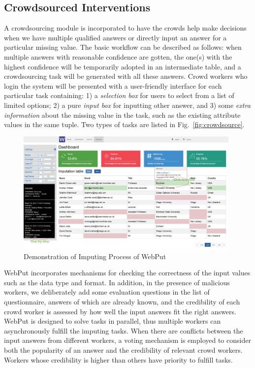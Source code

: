 \documentclass[sigconf]{acmart}
\begin{document}
\subsection{Crowdsourced Interventions}
%
A crowdsourcing module is incorporated to have the crowds help make decisions when we have multiple qualified answers or directly input an answer for a particular missing value.
%
The basic workflow can be described as follows: when multiple answers with reasonable confidence are gotten, the one(s) with the highest confidence will be temporarily adopted in an intermediate table, and a crowdsourcing task will be generated with all these answers.
%
Crowd workers who login the system will be presented with a user-friendly interface for each particular task containing: 1) a {\em selection box} for users to select from a list of limited options; 2) a pure {\em input box} for inputting other answer, and 3) some {\em extra information} about the missing value in the task, such as the existing attribute values in the same tuple.
%
Two types of tasks are listed in Fig.~\ref{fig:crowdsource}.


\begin{figure}[t]
  \setlength{\abovecaptionskip}{0pt}
  \centerline{\includegraphics[width=11cm]{images/process_.eps}}
  \caption{ \small Demonstration of Imputing Process of WebPut}
  \label{fig:process}
\end{figure}

%
WebPut incorporates mechanisms for checking the correctness of the input values such as the data type and format. In addition, in the presence of malicious workers, we deliberately add some evaluation questions in the list of questionnaire, answers of which are already known, and the credibility of each crowd worker is assessed by how well the input answers fit the right answers.
%
WebPut is designed to solve tasks in parallel, thus multiple workers can asynchronously fulfill the imputing tasks. When there are conflicts between the input answers from different workers, a voting mechanism is employed to consider both the popularity of an answer and the credibility of relevant crowd workers. Workers whose credibility is higher than others have priority to fulfill tasks.
\end{document}
